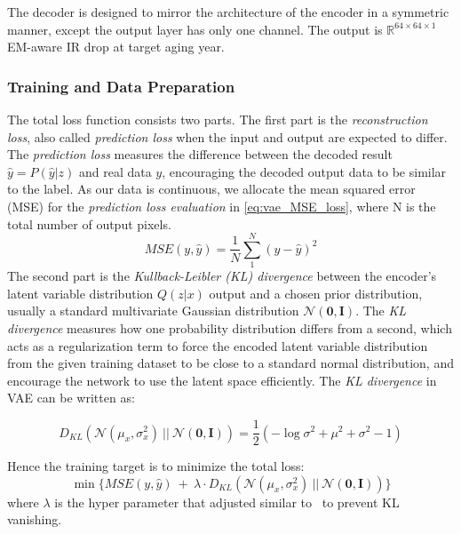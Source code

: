 The decoder is designed to mirror the architecture of the encoder in a symmetric manner, except the output layer has only one channel. 
The output is $\mathbb{R} ^{64\times 64\times 1}$ EM-aware IR drop at target aging year.

\subsubsection{Training and Data Preparation}
The total loss function consists two parts. The first part is the \textit{reconstruction loss}, also called \textit{prediction loss} when the input and output are expected to differ. The \textit{prediction loss} measures the difference between the decoded result $\hat{y} = P(\hat{y}|z)$ and real data $y$, encouraging the decoded output data to be similar to the label. As our data is continuous, we allocate the mean squared error (MSE) for the \textit{prediction loss evaluation} in  \eqref{eq:vae_MSE_loss}, where N is the total number of output pixels.
\begin{equation}
	\label{eq:vae_MSE_loss}
	\textit{MSE}(y, \hat{y}) = \frac{1}{N} \sum_{1}^{N} ( y - \hat{y})^{2}
\end{equation}
The second part is the \textit{Kullback-Leibler (KL) divergence} between the encoder's latent variable distribution $Q(z|x)$ output and a chosen prior distribution, usually a standard multivariate Gaussian distribution $\mathcal{N}(\textbf{0}, \textbf{I})$. The \textit{KL divergence} measures how one probability distribution differs from a second, which acts as a regularization term to force the encoded latent variable distribution from the given training dataset to be close to a standard normal distribution, and encourage the network to use the latent space efficiently. 
The \textit{KL divergence} in VAE can be written as:

\begin{equation}
	\label{eq:vae_KLD_loss}
	D_{KL}( \mathcal{N}(\mu_{x}, \sigma_{x}^{2}) ~ || ~ \mathcal{N}(\textbf{0}, \textbf{I} ) )  = \dfrac{1}{2} (-\log\sigma^{2} + \mu^{2} + \sigma^{2} - 1)
\end{equation}

Hence the training target is to minimize the total loss:
\begin{equation}
	\label{eq:var_total_loss}
	\min  \{ \textit{MSE} (y, \hat{y})  ~ + ~ \lambda \cdot D_{KL}( \mathcal{N}(\mu_{x}, \sigma_{x}^{2}) ~ || ~ \mathcal{N}(\textbf{0}, \textbf{I} ) )  \}
\end{equation}
where $\lambda$ is the hyper parameter that adjusted similar to~\cite{Fu:arxiv'19} to prevent KL vanishing.

